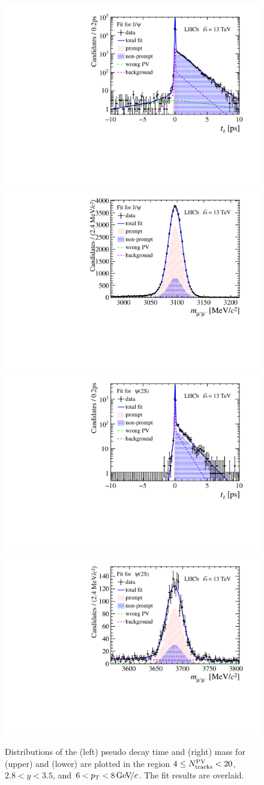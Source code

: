 \documentclass[12pt,a4paper]{article}
\begin{document}
 \begin{figure}[!tbp]
   \begin{center}
     \includegraphics[width=0.49\linewidth]{pdf/Jpsi/2DFit/n1y2pt4.pdf}
     \includegraphics[width=0.49\linewidth]{pdf/Jpsi/drawmass/n1y2pt4.pdf}
     \includegraphics[width=0.49\linewidth]{pdf/Psi2S/2DFit/n1y2pt4.pdf}
     \includegraphics[width=0.49\linewidth]{pdf/Psi2S/drawmass/n1y2pt4.pdf}
   \end{center}
   \caption{
   Distributions of the (left) pseudo decay time and (right) mass for (upper) \jpsi and (lower) \psitwos are plotted in the region $4\leq N_{\rm tracks}^{\rm PV} < 20$, $2.8<y<3.5$, and $6<p_{\mathrm{T}}<8\text{\,Ge\kern -0.1em V\!/}c$. The fit results are overlaid.
     }
   \label{fig:2Dtz}
 \end{figure}
\end{document}
